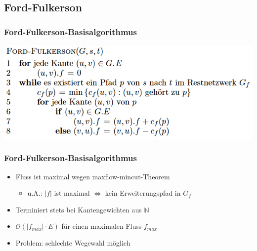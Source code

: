 \documentclass{beamer}
\newcommand{\ff}{Ford-Fulkerson}
\begin{document}
\subsection{Ford-Fulkerson}
\begin{frame}
\frametitle{\ff-Basisalgorithmus}
\begin{adjustbox}{width = \textwidth}
\includegraphics{../Grafiken/FF-Basis.png}
\end{adjustbox}
\end{frame}

\begin{frame}
\frametitle{\ff-Basisalgorithmus}
\begin{itemize}
\item Fluss ist maximal wegen maxflow-mincut-Theorem \begin{itemize}
\item u.A.: $\lvert f\rvert$ ist maximal $\Leftrightarrow$ kein Erweiterungspfad in $G_{f}$
\end{itemize}
\item Terminiert stets bei Kantengewichten aus $\mathbb{N}$
\item $\mathcal{O}(\lvert f_{max}\rvert \cdot E)$ für einen maximalen Fluss $f_{max}$
\item Problem: schlechte Wegewahl möglich
\end{itemize}
\end{frame}
\end{document}
